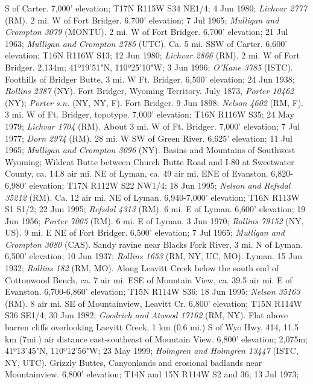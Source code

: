 S of Carter. 7,000' elevation; T17N R115W S34 NE1/4; 4 Jun 1980;
\textit{Lichvar 2777} (RM).
2 mi. W of Fort Bridger. 6,700’ elevation; 7 Jul 1965;
\textit{Mulligan and Crompton 3079} (MONTU).
2 mi. W of Fort Bridger. 6,700’ elevation; 21 Jul 1963;
\textit{Mulligan and Crompton 2785} (UTC).
Ca. 5 mi. SSW of Carter. 6,600' elevation; T16N R116W S13; 12 Jun 1980;
\textit{Lichvar 2866} (RM).
2 mi. W of Fort Bridger. 2,134m; 41º19'51"N, 110º25'10"W; 3 Jun 1996;
\textit{O'Kane 3785} (ISTC).
Foothills of Bridger Butte, 3 mi. W Ft. Bridger. 6,500’ elevation; 24 Jun 1938;
\textit{Rollins 2387} (NY).
Fort Bridger, Wyoming Territory. July 1873, \textit{Porter 10462} (NY);
\textit{Porter s.n.} (NY, NY, F).
Fort Bridger. 9 Jun 1898; \textit{Nelson 4602} (RM, F).
3 mi. W of Ft. Bridger, topotype.	7,000' elevation; T16N R116W S35; 24 May 1979;
\textit{Lichvar 1704} (RM).
About 3 mi. W of Ft. Bridger. 7,000' elevation;	7 Jul 1977;
\textit{Dorn 2974} (RM).
28 mi. W SW of Green River. 6,625’ elevation; 11 Jul 1965;
\textit{Mulligan and Crompton 3096} (NY).
Basins and Mountains of Southwest Wyoming; Wildcat Butte between Church Butte
Road and I-80 at Sweetwater County, ca. 14.8 air mi. NE of Lyman, ca. 49 air mi.
ENE of Evanston.  6,820-6,980' elevation; T17N R112W S22 NW1/4; 18 Jun 1995;
\textit{Nelson and Refsdal 35212} (RM).
Ca. 12 air mi. NE of Lyman. 6,940-7,000' elevation; T16N R113W S1 S1/2;
22 Jun 1995; \textit{Refsdal 4313} (RM).
6 mi. E of Lyman. 6,600’ elevation; 19 Jun 1956; \textit{Porter 7005} (RM).
6 mi. E of Lyman. 3 Jun 1970; \textit{Rollins 79152} (NY, US).
9 mi. E NE of Fort Bridger. 6,500’ elevation; 7 Jul 1965;
\textit{Mulligan and Crompton 3080} (CAS).
Sandy ravine near Blacks Fork River, 3 mi. N of Lyman.	6,500' elevation;
10 Jun 1937; \textit{Rollins 1653} (RM, NY, UC, MO).
Lyman. 15 Jun 1932; \textit{Rollins 182} (RM, MO).
Along Leavitt Creek below the south end of Cottonwood Bench, ca. 7 air mi. ESE
of Mountain View, ca. 39.5 air mi. E of Evanston.	6,700-6,860' elevation;
T15N R114W S36; 18 Jun 1995; \textit{Nelson 35163} (RM).
8 air mi. SE of Mountainview, Leavitt Cr. 6,800' elevation;
T15N R114W S36 SE1/4; 30 Jun 1982; \textit{Goodrich and Atwood 17162} (RM, NY).
Flat above barren cliffs overlooking Laevitt Creek, 1 km (0.6 mi.) S of Wyo Hwy.
414, 11.5 km (7mi.) air distance east-southeast of Mountain View.
6,800' elevation; 2,075m; 41º13'45"N, 110º12'56"W; 23 May 1999;
\textit{Holmgren and Holmgren 13447} (ISTC, NY, UTC).
Grizzly Buttes, Canyonlands and erosional badlands near Mountainview.
6,800' elevation;	T14N and 15N R114W S2 and 36; 13 Jul 1973;
